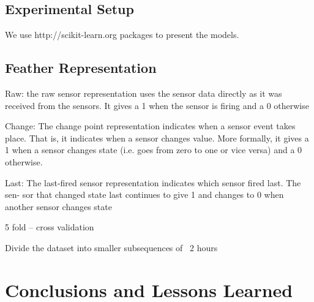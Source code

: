 \documentclass[11pt, oneside]{article}   	%
\begin{document}
\iffalse
The datasets available to us are:
	\begin{enumerate}
\item Kasteren dataset - has over a month long sensor information from 3 homes.
\item Tulum dataset - more than six month period from a single home
	\end{enumerate}
\fi

\subsection{Experimental Setup}

We use http://scikit-learn.org packages to present the models.



\subsection{Feather Representation}

Raw: the raw sensor representation uses the sensor data directly as it was received from the sensors. It gives a 1 when the sensor is firing and a 0 otherwise 


Change: The change point representation indicates when a sensor event takes place. That is, it indicates when a sensor changes value. More formally, it gives a 1 when a sensor changes state (i.e. goes from zero to one or vice versa) and a 0 otherwise.

Last: The last-fired sensor representation indicates which sensor fired last. The sen- sor that changed state last continues to give 1 and changes to 0 when another sensor changes state 

5 fold – cross validation

Divide the dataset into smaller subsequences of ~2 hours 





\section{Conclusions and Lessons Learned}


\end{document}
